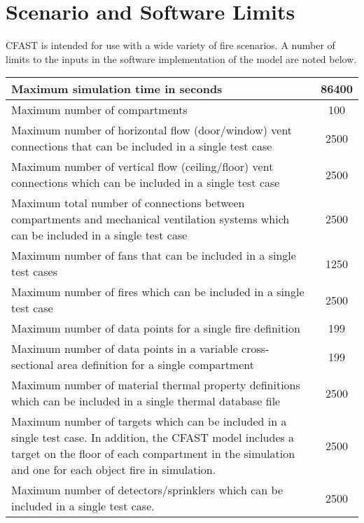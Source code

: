\chapter{Scenario and Software Limits}

CFAST is intended for use with a wide variety of fire scenarios.  A number of limits to the inputs in the software implementation of the model are noted below.


\begin{center}
\begin{tabular}{|p{15cm}|c|}
\hline
Maximum simulation time in seconds & 86400 \\ \hline
Maximum number of compartments & 100 \\ \hline
Maximum number of horizontal flow (door/window) vent connections that can be included in a single test case & 2500 \\ \hline
Maximum number of vertical flow (ceiling/floor) vent connections which can be included in a single test case & 2500 \\ \hline
Maximum total number of connections between compartments and mechanical ventilation systems which can be included in a single test case & 2500 \\ \hline
Maximum number of fans that can be included in a single test cases  & 1250 \\ \hline

Maximum number of fires which can be included in a single test case & 2500 \\ \hline
Maximum number of data points for a single  fire definition & 199 \\ \hline
Maximum number of data points in a variable cross-sectional area definition for a single compartment & 199 \\ \hline
Maximum number of material thermal property definitions which can be included in a single thermal database file & 2500 \\ \hline

Maximum number of targets which can be included in a single test case. In addition, the CFAST model includes a target on the floor of each compartment in the simulation and one for each object fire in simulation. & 2500 \\ \hline
Maximum number of detectors/sprinklers which can be included in a single test case. & 2500 \\ \hline

\hline
\end{tabular}
\end{center} 

\clearpage